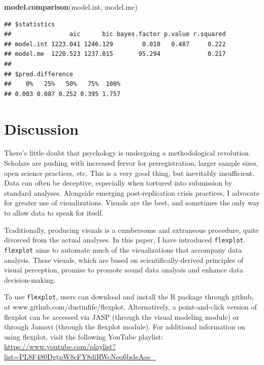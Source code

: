 \documentclass[
  doc]{apa6}
\newenvironment{Shaded}{\begin{snugshade}}{\end{snugshade}}
\newcommand{\KeywordTok}[1]{\textcolor[rgb]{0.13,0.29,0.53}{\textbf{#1}}}
\newcommand{\NormalTok}[1]{#1}
\begin{document}
\begin{Shaded}
\begin{Highlighting}[]
\KeywordTok{model.comparison}\NormalTok{(model.int, model.me)}
\end{Highlighting}
\end{Shaded}

\begin{verbatim}
## $statistics
##                aic      bic bayes.factor p.value r.squared
## model.int 1223.041 1246.129        0.010   0.487     0.222
## model.me  1220.523 1237.015       95.294             0.217
## 
## $pred.difference
##    0%   25%   50%   75%  100% 
## 0.003 0.087 0.252 0.395 1.757
\end{verbatim}

\hypertarget{discussion}{%
\section{Discussion}\label{discussion}}

There's little doubt that psychology is undergoing a methodological revolution. Scholars are pushing with increased fervor for preregistration, larger sample sizes, open science practices, etc. This is a very good thing, but inevitably insufficient. Data can often be deceptive, especially when tortured into submission by standard analyses. Alongside emerging post-replication crisis practices, I advocate for greater use of visualizations. Visuals are the best, and sometimes the only way to allow data to speak for itself.

Traditionally, producing visuals is a cumbersome and extraneous procedure, quite divorced from the actual analyses. In this paper, I have introduced \texttt{flexplot}. \texttt{flexplot} aims to automate much of the visualizations that accompany data analysis. These visuals, which are based on scientifically-derived principles of visual perception, promise to promote sound data analysis and enhance data decision-making.

To use \texttt{flexplot}, users can download and install the R package through github, at www.github.com/dustinfife/flexplot. Alternatively, a point-and-click version of flexplot can be accessed via JASP (through the visual modeling module) or through Jamovi (through the flexplot module). For additional information on using flexplot, visit the following YouTube playlist: \url{https://www.youtube.com/playlist?list=PL8F480DgtpW8cFY8diRWcNeq6bsleAoe_}

\newpage
\end{document}
